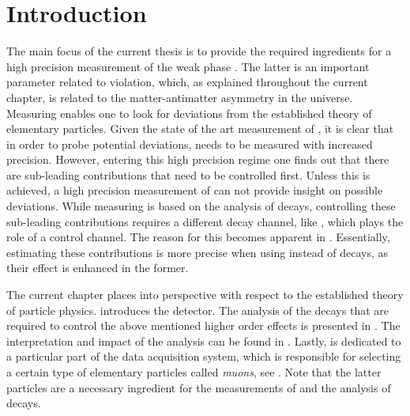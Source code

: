 
\chapter{Introduction}
\label{Introduction}

The main focus of the current thesis is to provide the required ingredients for a high precision measurement of
the weak phase \phis. The latter is an important parameter related to \CP violation, which, as explained throughout
the current chapter, is related to the matter-antimatter asymmetry in the universe. Measuring \phis enables one to look
for deviations from the established theory of elementary particles. Given the state of the art measurement of \phis \cite{phis-3fb-paper},
it is clear that in order to probe potential deviations, \phis needs to be measured with increased precision.
However, entering this high precision regime one finds out that there are sub-leading contributions that need to be
controlled first. Unless this is achieved, a high precision measurement of \phis can not provide insight on possible
deviations. While measuring \phis is based on the analysis of \BsJpsiPhi decays, controlling these sub-leading contributions
requires a different decay channel, like \BsJpsiKst, which plays the role of a control channel. The reason for this becomes apparent in .
Essentially, estimating these contributions is more precise when using \BsJpsiKst instead of \BsJpsiPhi decays,
as their effect is enhanced in the former.

The current chapter places \phis into perspective with respect to the established theory of particle physics.
 introduces the \lhcb detector. The analysis of the \BsJpsiKst decays that are
required to control the above mentioned higher order effects is presented in .
The interpretation and impact of the analysis can be found in .
Lastly,  is dedicated to a particular part of the \lhcb data acquisition system,
which is responsible for selecting a certain type of elementary particles called {\it muons}, see .
Note that the latter particles are a necessary ingredient for the measurements of \phis and
the analysis of \BsJpsiKst decays.

